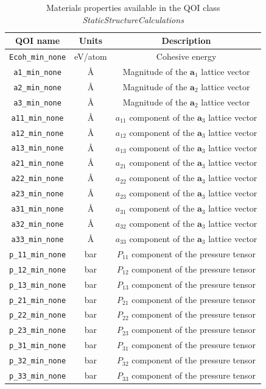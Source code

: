 \begin{table}[p]
	\centering
	\caption{Materials properties available in the QOI class \emph{StaticStructureCalculations}}
	\label{tbl:pypospack_qoi_lmps_min_none}
	\begin{tabular}{ccc}
		\hline
		QOI name & Units & Description \\
		\hline
	  \verb|Ecoh_min_none|
			& eV/atom
			& Cohesive energy\\
    \verb|a1_min_none|
		  & \AA
			& Magnitude of the $\bm{a}_1$ lattice vector \\
		\verb|a2_min_none|
			& \AA
			& Magnitude of the $\bm{a}_2$ lattice vector \\
		\verb|a3_min_none|
			& \AA
			& Magnitude of the $\bm{a}_2$ lattice vector \\
    \verb|a11_min_none|
			& \AA
			& $a_{11}$ component of the $\bm{a}_3$ lattice vector \\
		\verb|a12_min_none|
			& \AA
			& $a_{12}$ component of the $\bm{a}_3$ lattice vector \\
		\verb|a13_min_none|
			& \AA
			& $a_{13}$ component of the $\bm{a}_3$ lattice vector \\
    \verb|a21_min_none|
			& \AA
			& $a_{21}$ component of the $\bm{a}_3$ lattice vector \\
		\verb|a22_min_none|
			& \AA
			& $a_{22}$ component of the $\bm{a}_3$ lattice vector \\
		\verb|a23_min_none|
			& \AA
			& $a_{23}$ component of the $\bm{a}_3$ lattice vector \\
		\verb|a31_min_none|
			& \AA
			& $a_{31}$ component of the $\bm{a}_3$ lattice vector \\
		\verb|a32_min_none|
			& \AA
			& $a_{32}$ component of the $\bm{a}_3$ lattice vector \\
		\verb|a33_min_none|
			& \AA
			& $a_{33}$ component of the $\bm{a}_3$ lattice vector \\
		\verb|p_11_min_none|
			& bar
			& $P_{11}$ component of the pressure tensor \\
		\verb|p_12_min_none|
			& bar
			& $P_{12}$ component of the pressure tensor \\
		\verb|p_13_min_none|
			& bar
			& $P_{13}$ component of the pressure tensor \\
		\verb|p_21_min_none|
			& bar
			& $P_{21}$ component of the pressure tensor \\
		\verb|p_22_min_none|
			& bar
			& $P_{22}$ component of the pressure tensor \\
		\verb|p_23_min_none|
			& bar
			& $P_{23}$ component of the pressure tensor \\
    \verb|p_31_min_none|
		  & bar
			& $P_{31}$ component of the pressure tensor \\
		\verb|p_32_min_none|
			& bar
			& $P_{32}$ component of the pressure tensor \\
		\verb|p_33_min_none|
			& bar
			& $P_{33}$ component of the pressure tensor \\
		\hline
	\end{tabular}
\end{table}


